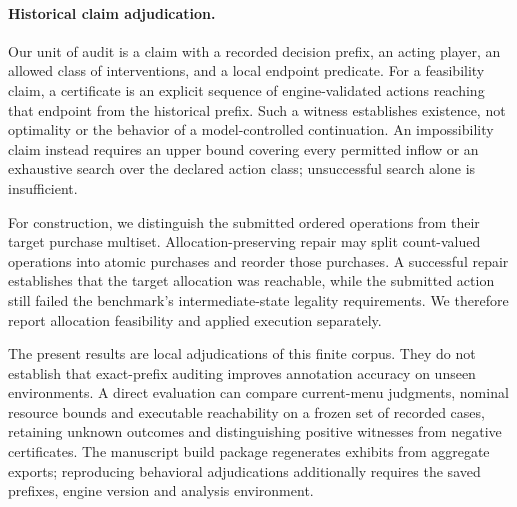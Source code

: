 \paragraph{Historical claim adjudication.}
Our unit of audit is a claim with a recorded decision prefix, an acting player, an allowed class of interventions, and a local endpoint predicate. For a feasibility claim, a certificate is an explicit sequence of engine-validated actions reaching that endpoint from the historical prefix. Such a witness establishes existence, not optimality or the behavior of a model-controlled continuation. An impossibility claim instead requires an upper bound covering every permitted inflow or an exhaustive search over the declared action class; unsuccessful search alone is insufficient.

For construction, we distinguish the submitted ordered operations from their target purchase multiset. Allocation-preserving repair may split count-valued operations into atomic purchases and reorder those purchases. A successful repair establishes that the target allocation was reachable, while the submitted action still failed the benchmark's intermediate-state legality requirements. We therefore report allocation feasibility and applied execution separately.

The present results are local adjudications of this finite corpus. They do not establish that exact-prefix auditing improves annotation accuracy on unseen environments. A direct evaluation can compare current-menu judgments, nominal resource bounds and executable reachability on a frozen set of recorded cases, retaining unknown outcomes and distinguishing positive witnesses from negative certificates. The manuscript build package regenerates exhibits from aggregate exports; reproducing behavioral adjudications additionally requires the saved prefixes, engine version and analysis environment.
